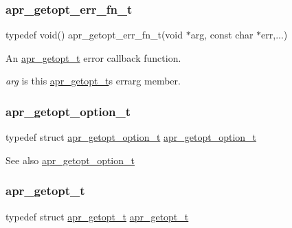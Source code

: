 \subsubsection{\texorpdfstring{apr\+\_\+getopt\+\_\+err\+\_\+fn\+\_\+t}{apr\_getopt\_err\_fn\_t}}
{\footnotesize\ttfamily typedef void() apr\+\_\+getopt\+\_\+err\+\_\+fn\+\_\+t(void $\ast$arg, const char $\ast$err,...)}

An {\ttfamily \mbox{\hyperlink{structapr__getopt__t}{apr\+\_\+getopt\+\_\+t}}} error callback function.

{\itshape arg} is this {\ttfamily \mbox{\hyperlink{structapr__getopt__t}{apr\+\_\+getopt\+\_\+t}}\textquotesingle{}s} {\ttfamily errarg} member. \mbox{\label{group__apr__getopt_ga114d2af52f3573eaeee2ffa73b2c4ff5}} 
\subsubsection{\texorpdfstring{apr\+\_\+getopt\+\_\+option\+\_\+t}{apr\_getopt\_option\_t}}
{\footnotesize\ttfamily typedef struct \mbox{\hyperlink{structapr__getopt__option__t}{apr\+\_\+getopt\+\_\+option\+\_\+t}} \mbox{\hyperlink{structapr__getopt__option__t}{apr\+\_\+getopt\+\_\+option\+\_\+t}}}

\begin{DoxySeeAlso}{See also}
\mbox{\hyperlink{structapr__getopt__option__t}{apr\+\_\+getopt\+\_\+option\+\_\+t}} 
\end{DoxySeeAlso}
\mbox{\label{group__apr__getopt_gaed49565eab64803e93f76d0c40d6873d}} 
\subsubsection{\texorpdfstring{apr\+\_\+getopt\+\_\+t}{apr\_getopt\_t}}
{\footnotesize\ttfamily typedef struct \mbox{\hyperlink{structapr__getopt__t}{apr\+\_\+getopt\+\_\+t}} \mbox{\hyperlink{structapr__getopt__t}{apr\+\_\+getopt\+\_\+t}}}

